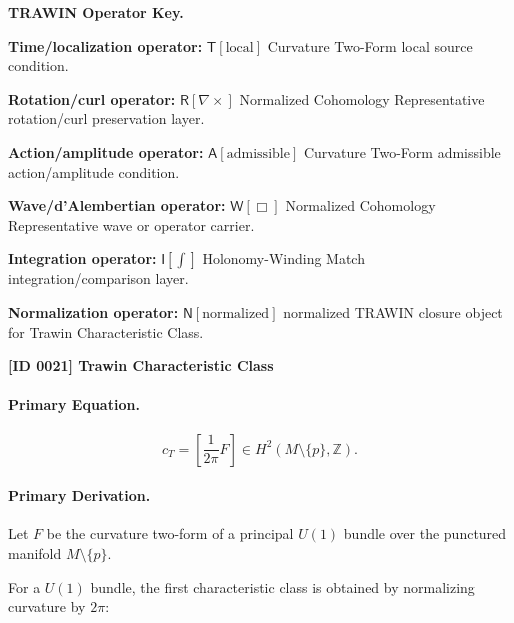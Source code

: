 \par\vspace{0.45\baselineskip}
\noindent\begin{minipage}[t]{\linewidth}
\begingroup
\small
\raggedright
\textbf{TRAWIN Operator Key.}\par
\noindent\textbf{Time/localization operator:} $\mathsf{T}\!\left[\mathrm{local}\right]$ Curvature Two-Form local source condition.\par
\noindent\textbf{Rotation/curl operator:} $\mathsf{R}\!\left[\nabla\times\right]$ Normalized Cohomology Representative rotation/curl preservation layer.\par
\noindent\textbf{Action/amplitude operator:} $\mathsf{A}\!\left[\mathrm{admissible}\right]$ Curvature Two-Form admissible action/amplitude condition.\par
\noindent\textbf{Wave/d'Alembertian operator:} $\mathsf{W}\!\left[\Box\right]$ Normalized Cohomology Representative wave or operator carrier.\par
\noindent\textbf{Integration operator:} $\mathsf{I}\!\left[\int\right]$ Holonomy-Winding Match integration/comparison layer.\par
\noindent\textbf{Normalization operator:} $\mathsf{N}\!\left[\mathrm{normalized}\right]$ normalized TRAWIN closure object for Trawin Characteristic Class.\par
\endgroup
\end{minipage}

\clearpage
\noindent\textbf{[ID 0021] Trawin Characteristic Class}\par
\vspace{0.35em}
\paragraph{Primary Equation.}
\begin{equation}
c_T
=
\left[
\frac{1}{2\pi}F
\right]
\in
H^2(M\setminus\{p\},\mathbb{Z}) .
\end{equation}

\paragraph{Primary Derivation.}
Let $F$ be the curvature two-form of a principal $U(1)$ bundle over the punctured manifold $M\setminus\{p\}$.

For a $U(1)$ bundle, the first characteristic class is obtained by normalizing curvature by $2\pi$:

